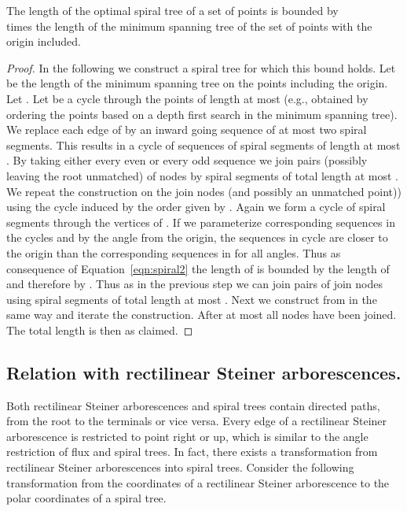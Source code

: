 \documentclass{journalA4}
\begin{document}
\begin{theorem}
The length of the optimal spiral tree of a set of points is bounded by \\ times the length of the minimum spanning tree of the set of points with the origin included.
\end{theorem}
\begin{proof}
In the following we construct a spiral tree for which this bound holds. Let  be the length of the minimum spanning tree on the points including the origin. Let . Let  be a cycle through the points of length at most  (e.g., obtained by ordering the points based on a depth first search in the minimum spanning tree). We replace each edge of  by an inward going sequence of at most two spiral segments. This results in a cycle  of sequences of spiral segments of length at most . By taking either every even or every odd sequence we join pairs (possibly leaving the root unmatched) of nodes by spiral segments of total length at most . We repeat the construction on the join nodes (and possibly an unmatched point)) using the cycle  induced by the order given by . Again we form a cycle of spiral segments through the vertices of . If we parameterize corresponding sequences in the cycles  and  by the angle  from the origin, the sequences in cycle  are closer to the origin than the corresponding sequences in  for all angles. Thus as consequence of Equation~\ref{eqn:spiral2} the length of  is bounded by the length of  and therefore by . Thus as in the previous step we can join pairs of join nodes using spiral segments of total length at most . Next we construct  from  in the same way and iterate the construction. After at most  all nodes have been joined. The total length is then  as claimed.
\end{proof}

\noindent
\subsection{Relation with rectilinear Steiner arborescences.} \label{sec:transformation}
Both rectilinear Steiner arborescences and spiral trees contain directed paths, from the root to the terminals or vice versa. Every edge of a rectilinear Steiner arborescence is restricted to point right or up, which is similar to the angle restriction of flux and spiral trees. In fact, there exists a transformation from rectilinear Steiner arborescences into spiral trees. Consider the following transformation from the coordinates
 of a rectilinear Steiner arborescence to the polar coordinates  of a spiral tree.
\end{document}
